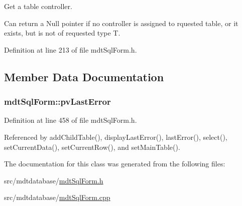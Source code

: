Get a table controller. 

Can return a Null pointer if no controller is assigned to rquested table, or it exists, but is not of requested type T. 

Definition at line 213 of file mdt\-Sql\-Form.\-h.



\subsection{Member Data Documentation}
\hypertarget{classmdt_sql_form_afc24e8dedd1249a29708347fdff560fd}{
\subsubsection[{pv\-Last\-Error}]{ mdt\-Sql\-Form\-::pv\-Last\-Error\hspace{0.3cm}{\ttfamily [protected]}}}\label{classmdt_sql_form_afc24e8dedd1249a29708347fdff560fd}


Definition at line 458 of file mdt\-Sql\-Form.\-h.



Referenced by add\-Child\-Table(), display\-Last\-Error(), last\-Error(), select(), set\-Current\-Data(), set\-Current\-Row(), and set\-Main\-Table().



The documentation for this class was generated from the following files\-:\begin{DoxyCompactItemize}
\item 
src/mdtdatabase/\hyperlink{mdt_sql_form_8h}{mdt\-Sql\-Form.\-h}\item 
src/mdtdatabase/\hyperlink{mdt_sql_form_8cpp}{mdt\-Sql\-Form.\-cpp}\end{DoxyCompactItemize}
